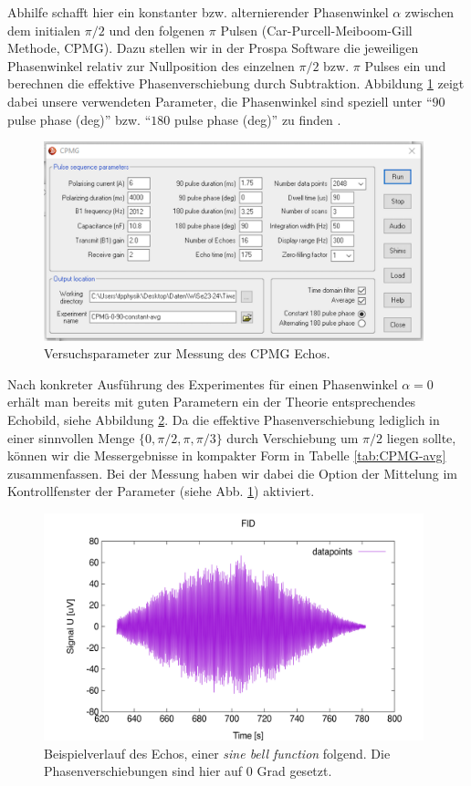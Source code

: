 \documentclass[../../main.tex]{subfiles}
\begin{document}
        Abhilfe schafft hier ein konstanter bzw. alternierender Phasenwinkel $\alpha$ zwischen dem initialen $\pi/2$ und den folgenen $\pi$ Pulsen (Car-Purcell-Meiboom-Gill Methode, CPMG). Dazu stellen wir in der Prospa Software die jeweiligen Phasenwinkel relativ zur Nullposition des einzelnen $\pi/2$ bzw. $\pi$ Pulses ein und berechnen die effektive Phasenverschiebung durch Subtraktion. Abbildung \ref{fig:CPMG_Parameter} zeigt dabei unsere verwendeten Parameter, die Phasenwinkel sind speziell unter \enquote{$90$ pulse phase (deg)} bzw. \enquote{$180$ pulse phase (deg)} zu finden \cite[ch 5.3]{doc:EFNMRStudentManual}.
        \begin{figure}[H]
            \centering
            \includegraphics[width=11cm]{Bilddateien/10/CPMG_Parameter.png}
            \caption{Versuchsparameter zur Messung des CPMG Echos.}
            \label{fig:CPMG_Parameter}
        \end{figure}
        Nach konkreter Ausführung des Experimentes für einen Phasenwinkel $\alpha = 0$ erhält man bereits mit guten Parametern ein der Theorie entsprechendes Echobild, siehe Abbildung \ref{fig:sine-bell-func_example}. Da die effektive Phasenverschiebung lediglich in einer sinnvollen Menge $\{0,\pi/2,\pi,\pi/3\}$ durch Verschiebung um $\pi/2$ liegen sollte, können wir die Messergebnisse in kompakter Form in Tabelle \ref{tab:CPMG-avg} zusammenfassen. Bei der Messung haben wir dabei die Option der Mittelung im Kontrollfenster der Parameter (siehe Abb. \ref{fig:CPMG_Parameter}) aktiviert.
        \begin{figure}[H]
            \centering
            \includegraphics[width=11cm]{Bilddateien/10/sine-bell-func_example.png}
            \caption{Beispielverlauf des Echos, einer \emph{sine bell function} folgend. Die Phasenverschiebungen sind hier auf $0$ Grad gesetzt.}
            \label{fig:sine-bell-func_example} 
        \end{figure}
\end{document}
